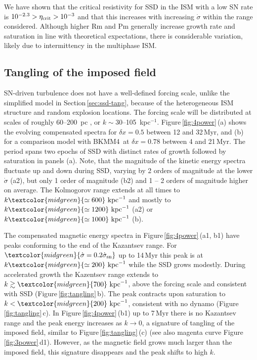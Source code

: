 \documentclass[preprint2]{aastex63}
\newcommand\SNr{\dot\sigma_{\rm sn}}
\newcommand\kpc{~ {\rm kpc}}
\newcommand\dx{ {\delta x}}
\newcommand\BKM{{\sf BKMM4}}
\newcommand{\fg}[1]{\textcolor{midgreen}{#1}}
\newcommand{\mm}[1]{\textcolor{mypurple}{#1}}
\begin{document}
 \fg{We have shown that the critical resistivity for SSD in the ISM with a
 low SN rate is $10^{-2.3}>\eta_{\rm crit}>10^{-3}$ and
 that this increases with increasing
 $\dot\sigma$ within the range considered.
 Although higher Rm and Pm generally increase growth rate
 and saturation
 in line with theoretical expectations,
 there is considerable variation, likely due to intermittency in
   the multiphase ISM.}
 
 
\subsection{\fg{Tangling of the imposed field}} \label{sec:Balsara}
  
 SN-driven turbulence does not have a well-defined forcing scale, unlike the
 simplified model in Section\,\ref{sec:ssd-tang}, because of the
 heterogeneous ISM structure and random explosion locations.
 The forcing scale will be distributed at scales
 \fg{of roughly 60--200~pc
   \citep{joung2006,avillez2007,HSSFG17}, or $k \sim 30$--105~kpc$^{-1}$}.
 Figure\,\ref{fig:4power}\,(a) shows the evolving compensated spectra for 
 $\dx=0.5$ between \fg{12} and 32\,Myr\fg{, and (b) for a comparison model
 with \BKM\ at $\dx=0.78$ between 4 and 21\,Myr.}
 \fg{The period spans two epochs of SSD with distinct rates of growth 
 followed by saturation in panels (a).
 Note, that the magnitude of the kinetic energy spectra fluctuate up and down
 during SSD, varying by 2 orders of magnitude at the lower $\dot\sigma$ (a2),
 but only 1 order of magnitude (b2) and 1 -- 2 orders of magnitude higher
 on average.} 
 The Kolmogorov range extends at all times to $k\fg{\simeq600}\kpc^{-1}$ and
 mostly to $k\fg{\simeq1200}\kpc^{-1}$ (a2) or $k\fg{\simeq1000}\kpc^{-1}$ (b). 

 The compensated magnetic energy spectra in Figure\,\ref{fig:4power}\,(a1, b1)
 have \fg{peaks conforming to the end of the Kazantsev range.
 For $\fg{\dot\sigma=0.2\SNr}$ up to 14\,Myr this peak is at
 $k\fg{\simeq200}\kpc^{-1}$ while the
 SSD grows modestly.
 During accelerated growth the Kazentsev range extends to}
 $k\gtrsim\fg{700}\kpc^{-1}$, above the forcing scale and consistent with SSD
 (Figure\,\ref{fig:tangling}\,b).
 The peak contracts upon saturation to $k<\fg{200}\kpc^{-1}$, consistent with no
 dynamo (Figure\,\ref{fig:tangling}\,c).
 In Figure\,\ref{fig:4power}\,(b1) \fg{up to 7\,Myr there is no Kazantsev range
 and the peak energy increases as $k\rightarrow0$, a signature of tangling of
 the imposed field, similar to Figure\,\ref{fig:tangling}\,(c) (see also
 magenta curve Figure\,\ref{fig:3power}\,d1).
 However, as the magnetic field grows much larger than the imposed field,
 this signature disappears and the peak shifts to high $k$.}
 
\end{document}
